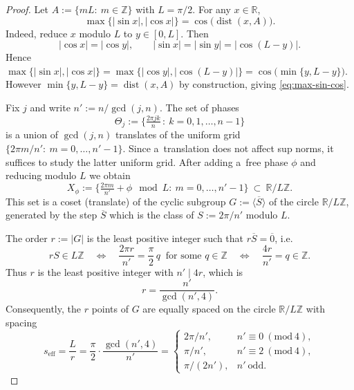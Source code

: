 \documentclass[10pt,a4paper]{amsart}
\begin{document}
\begin{proof}
Let $A:=\{mL:\ m\in\mathbb Z\}$ with $L=\pi/2$. For any $x\in\mathbb R$,
\begin{equation}\label{eq:max-sin-cos}
\max\{|\sin x|,|\cos x|\}=\cos\big(\operatorname{dist}(x,A)\big).
\end{equation}
Indeed, reduce $x$ modulo $L$ to $y\in[0,L]$. Then
\[
|\cos x|=|\cos y|,\qquad |\sin x|=|\sin y|=|\cos(L-y)|.
\]
Hence $\max\{|\sin x|,|\cos x|\}=\max\{|\cos y|,|\cos(L-y)|\}=\cos\big(\min\{y,L-y\}\big)$.
However $\min\{y,L-y\}=\operatorname{dist}(x,A)$ by construction, giving \eqref{eq:max-sin-cos}.

\smallskip

Fix $j$ and write $n':=n/\gcd(j,n)$. The set of phases
\[
\Theta_j:=\Big\{\tfrac{2\pi jk}{n}\,:\ k=0,1,\dots,n-1\Big\}
\]
is a union of $\gcd(j,n)$ translates of the uniform grid $\{2\pi m/n':\ m=0,\dots,n'-1\}$. Since a~translation does not affect sup norms, it suffices to study the latter uniform grid. After adding a~free phase $\phi$ and reducing modulo $L$ we obtain
\[
X_\phi:=\Big\{\tfrac{2\pi m}{n'}+\phi\ \bmod L:\ m=0,\dots,n'-1\Big\}\ \subset \ \mathbb R/L\mathbb Z.
\]
This set is a coset (translate) of the cyclic subgroup $G:=\langle \overline{S}\rangle$ of the circle $\mathbb R/L\mathbb Z$, generated by the step $\overline{S}$ which is the class of $S:=2\pi/n'$ modulo $L$.

\smallskip

The order $r:=|G|$ is the least positive integer such that $r\overline{S}=\overline{0}$, i.e.
\[
rS\in L\mathbb Z \quad\Longleftrightarrow\quad \frac{2\pi r}{n'}=\frac{\pi}{2}\,q \ \text{ for some } q\in\mathbb Z
\quad\Longleftrightarrow\quad \frac{4r}{n'}=q\in\mathbb Z.
\]
Thus $r$ is the least positive integer with $n' \mid 4r$, which is
\[
r=\frac{n'}{\gcd(n',4)}.
\]
Consequently, the $r$ points of $G$ are equally spaced on the circle $\mathbb R/L\mathbb Z$ with spacing
\begin{equation}\label{eq:seff}
s_{\mathrm{eff}}=\frac{L}{r}=\frac{\pi}{2}\cdot\frac{\gcd(n',4)}{n'}
=
\begin{cases}
2\pi/n',   & n'\equiv 0\ (\mathrm{mod}\ 4),\\[1mm]
\pi/n',    & n'\equiv 2\ (\mathrm{mod}\ 4),\\[1mm]
\pi/(2n'), & n'\ \text{odd}.
\end{cases}
\end{equation}

\smallskip


\end{proof}
\end{document}
